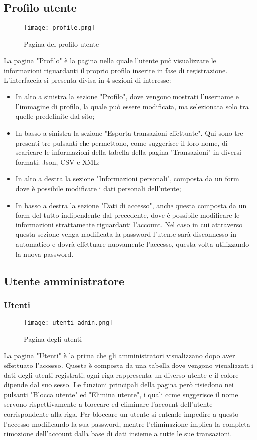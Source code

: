 \documentclass[binding=0.6cm, oneside, noexaminfo, italian]{sapthesis}
\begin{document}
\subsection{Profilo utente}
\begin{figure}[h]
    \centering
    \texttt{[image: profile.png]}
    \caption{Pagina del profilo utente}
    \label{fig:profile}
\end{figure}
La pagina "Profilo" è la pagina nella quale l'utente può visualizzare le informazioni riguardanti il proprio profilo inserite in fase di registrazione. L'interfaccia si presenta divisa in 4 sezioni di interesse:
\begin{itemize}
    \item In alto a sinistra la sezione "Profilo", dove vengono mostrati l'username e l'immagine di profilo, la quale può essere modificata, ma selezionata solo tra quelle predefinite dal sito;
    \item In basso a sinistra la sezione "Esporta transazioni effettuate". Qui sono tre presenti tre pulsanti che permettono, come suggerisce il loro nome, di scaricare le informazioni della tabella della pagina "Transazioni" in diversi formati: Json, CSV e XML;
    \item In alto a destra la sezione "Informazioni personali", composta da un form dove è possibile modificare i dati personali dell'utente;
    \item In basso a destra la sezione "Dati di accesso", anche questa composta da un form del tutto indipendente dal precedente, dove è possibile modificare le informazioni strattamente riguardanti l'account. Nel caso in cui attraverso questa sezione venga modificata la password l'utente sarà disconnesso in automatico e dovrà effettuare nuovamente l'accesso, questa volta utilizzando la nuova password.
\end{itemize}
\subsection{Utente amministratore}
\subsubsection{Utenti}
\begin{figure}[h]
    \centering
    \texttt{[image: utenti\_admin.png]}
    \caption{Pagina degli utenti}
    \label{fig:utenti_admin}
\end{figure}
La pagina "Utenti" è la prima che gli amministratori visualizzano dopo aver effettuato l'accesso. Questa è composta da una tabella dove vengono visualizzati i dati degli utenti registrati; ogni riga rappresenta un diverso utente e il colore dipende dal suo sesso. Le funzioni principali della pagina però risiedono nei pulsanti "Blocca utente" ed "Elimina utente", i quali come suggerisce il nome servono rispettivamente a bloccare ed eliminare l'account dell'utente corrispondente alla riga. Per bloccare un utente si entende impedire a questo l'accesso modificando la sua password, mentre l'eliminazione implica la completa rimozione dell'account dalla base di dati insieme a tutte le sue transazioni.
\end{document}
